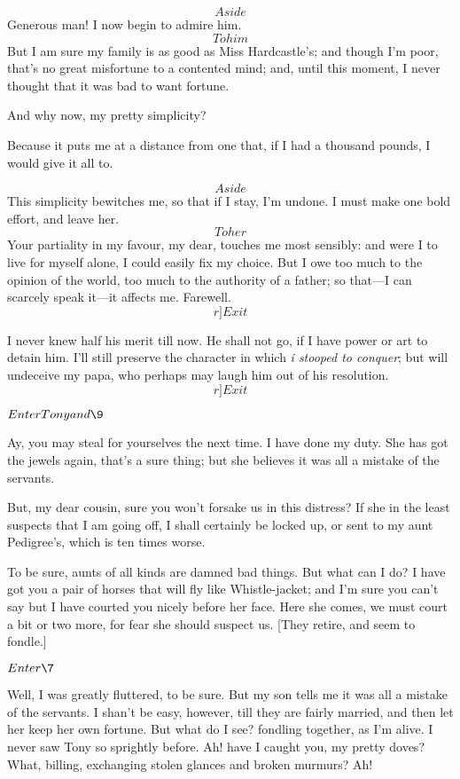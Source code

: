 \documentclass{book}
\begin{document}
\8  \[Aside\]  Generous man!  I now begin to admire him. 
\[To him\]  But I am sure my family is as good as Miss Hardcastle's; and
though I'm poor, that's no great misfortune to a contented mind; and,
until this moment, I never thought that it was bad to want fortune.

\2  And why now, my pretty simplicity?

\8  Because it puts me at a distance from one that, if I
had a thousand pounds, I would give it all to.

\2  \[Aside\]  This simplicity bewitches me, so that if I stay, I'm
undone.  I must make one bold effort, and leave her.  \[To her\]  Your
partiality in my favour, my dear, touches me most sensibly: and were I
to live for myself alone, I could easily fix my choice.  But I owe too
much to the opinion of the world, too much to the authority of a
father; so that---I can scarcely speak it---it affects me.  Farewell. 
\[r]Exit\]

\8  I never knew half his merit till now.  He shall not
go, if I have power or art to detain him.  I'll still preserve the
character in which \textit{i stooped to conquer}; but will undeceive my papa,
who perhaps may laugh him out of his resolution.  \[r]Exit\]


\(Enter Tony and \9\)


\5  Ay, you may steal for yourselves the next time.  I have done my
duty.  She has got the jewels again, that's a sure thing; but she
believes it was all a mistake of the servants.

\9  But, my dear cousin, sure you won't forsake us in this
distress?  If she in the least suspects that I am going off, I shall
certainly be locked up, or sent to my aunt Pedigree's, which is ten
times worse.

\5  To be sure, aunts of all kinds are damned bad things.  But what
can I do?  I have got you a pair of horses that will fly like
Whistle-jacket; and I'm sure you can't say but I have courted you
nicely before her face.  Here she comes, we must court a bit or two
more, for fear she should suspect us.  [They retire, and seem to
fondle.]


\(Enter \7\)


\7  Well, I was greatly fluttered, to be sure.  But my
son tells me it was all a mistake of the servants.  I shan't be easy,
however, till they are fairly married, and then let her keep her own
fortune.  But what do I see? fondling together, as I'm alive.  I never
saw Tony so sprightly before.  Ah! have I caught you, my pretty doves? 
What, billing, exchanging stolen glances and broken murmurs?  Ah!
\end{document}
